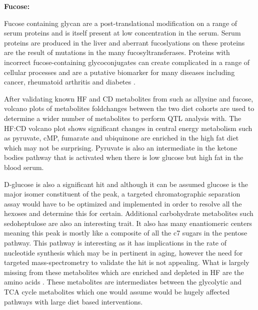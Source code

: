 \documentclass[a4paper,11pt,twoside]{book}
\begin{document}
	\textbf{Fucose:}
	
	Fucose containing glycan are a post-translational modification on a range of serum proteins and is itself present at low concentration in the serum. Serum proteins are produced in the liver and aberrant fucoslyations on these proteins are the result of mutations in the many fucosyltransferases\citep{Becker2003Fucose}. Proteins with incorrect fucose-containing glycoconjugates can create complicated in a range of cellular processes and are a putative biomarker for many diseases including cancer, rheumatoid  arthritis and diabetes \citep{Wiese1997Effect}. 
	
	After validating known HF and CD metabolites from \citep{Williams2016SystemsFunction} such as allysine and fucose, volcano plots of metabolites foldchanges between the two diet cohorts are used to determine a wider number of metabolites to perform QTL analysis with. The HF:CD volcano plot shows significant changes in central energy metabolism such as pyruvate, cMP, fumarate and ubiquinone are enriched in the high fat diet which may not be surprising. Pyruvate is also an intermediate in the ketone bodies pathway that is activated when there is low glucose but high fat in the blood serum. 
	
	D-glucose is also a significant hit and although it can be assumed glucose is the major isomer constituent of the peak, a targeted chromatographic separation assay would have to be optimized and implemented in order to resolve all the hexoses and determine this for certain. Additional carbohydrate metabolites such sedoheptulose are also an interesting trait. It also has many enantiomeric centers meaning this peak is mostly like a composite of all the c7 sugars in the pentose pathway. This pathway is interesting as it has implications in the rate of nucleotide synthesis which may be in pertinent in aging, however the need for targeted mass-spectrometry to validate the hit is not appealing. What is largely missing from these metabolites which are enriched and depleted in HF are the amino acids . These metabolites are intermediates between the glycolytic and TCA cycle metabolites which one would assume would be hugely affected pathways with large diet based interventions.
	
\end{document}
